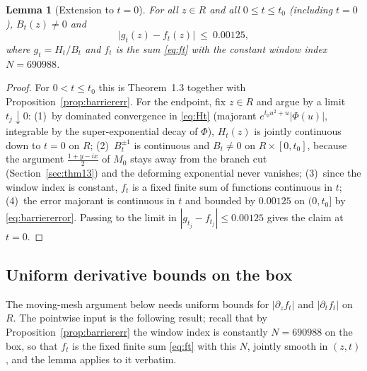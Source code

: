\documentclass[11pt]{article}
\newtheorem{lemma}[theorem]{Lemma}
\theoremstyle{definition}
\begin{document}
\begin{lemma}[Extension to $t=0$]\label{lem:tzero}
For all $z\in R$ and all $0\le t\le t_0$ (including $t=0$),
$B_t(z)\neq0$ and
\[
\bigl|g_t(z)-f_t(z)\bigr|\ \le\ 0.00125,
\]
where $g_t=H_t/B_t$ and $f_t$ is the sum \eqref{eq:ft} with the
constant window index $N=690988$.
\end{lemma}

\begin{proof}
For $0<t\le t_0$ this is Theorem~1.3 together with
Proposition~\ref{prop:barriererr}. For the endpoint, fix $z\in R$
and argue by a limit $t_j\downarrow0$: (1)~by dominated convergence
in \eqref{eq:Ht} (majorant $e^{t_0u^2+u}|\Phi(u)|$, integrable by
the super-exponential decay of $\Phi$), $H_t(z)$ is jointly
continuous down to $t=0$ on $R$; (2)~$B_t^{\pm1}$ is continuous and
$B_t\neq0$ on $R\times[0,t_0]$, because the argument
$\frac{1+y-ix}{2}$ of $M_0$ stays away from the branch cut
(Section~\ref{sec:thm13}) and the deforming exponential never
vanishes; (3)~since the window index is constant, $f_t$ is a fixed
finite sum of functions continuous in $t$; (4)~the error majorant is
continuous in $t$ and bounded by $0.00125$ on $(0,t_0]$ by
\eqref{eq:barriererror}. Passing to the limit in
$|g_{t_j}-f_{t_j}|\le0.00125$ gives the claim at $t=0$.
\end{proof}

\subsection{Uniform derivative bounds on the box}\label{sec:derivbox}

The moving-mesh argument below needs uniform bounds for
$|\partial_zf_t|$ and $|\partial_tf_t|$ on $R$. The pointwise input
is the following result; recall that by
Proposition~\ref{prop:barriererr} the window index is constantly
$N=690988$ on the box, so that $f_t$ is the fixed finite sum
\eqref{eq:ft} with this $N$, jointly smooth in $(z,t)$, and the
lemma applies to it verbatim.
\end{document}
